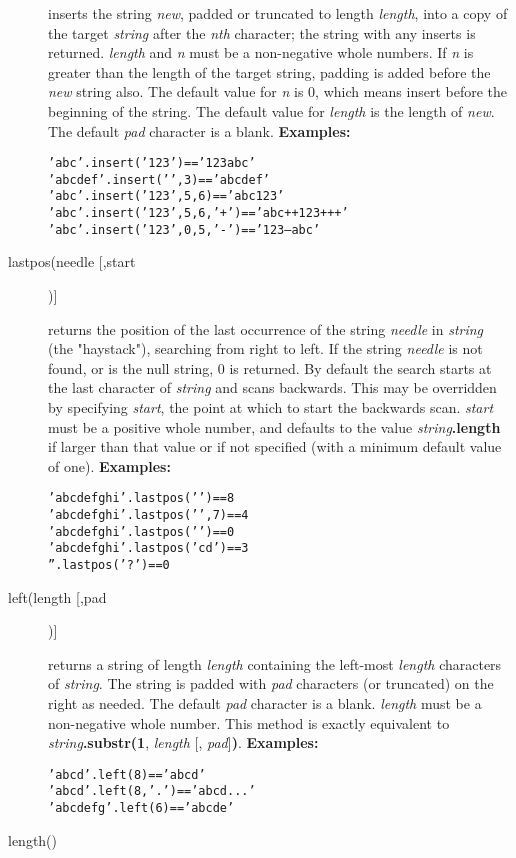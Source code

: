 \begin{description}
inserts the string \emph{new}, padded or truncated to length
\emph{length}, into a copy of the target \emph{string} after the
\emph{n}\emph{th} character; the string with any inserts is returned.
\emph{length} and \emph{n} must be a non-negative whole numbers.
If \emph{n} is greater than the length of the target string,
padding is added before the \emph{new} string also.
The default value for \emph{n} is 0, which means insert before the
beginning of the string.  The default value for \emph{length} is
the length of \emph{new}.  The default \emph{pad} character is
a blank.
 \textbf{Examples:}
\begin{alltt}
'abc'.insert('123')         == '123abc'
'abcdef'.insert(' ',3)      == 'abc def'
'abc'.insert('123',5,6)     == 'abc  123   '
'abc'.insert('123',5,6,'+') == 'abc++123+++'
'abc'.insert('123',0,5,'-') == '123--abc'
\end{alltt}
\item[lastpos(needle [,start])]\label{reflastpos}

returns the position of the last occurrence of the string
\emph{needle} in \emph{string} (the "haystack"), searching
from right to left.
If the string \emph{needle} is not found, or is the null string,
0 is returned.
By default the search starts at the last character of
\emph{string} and scans backwards.
This may be overridden by specifying \emph{start}, the point at
which to start the backwards scan.
\emph{start} must be a positive whole number, and defaults to the
value \emph{string}\textbf{.length} if larger than that
value or if not specified (with a minimum default value of one).
 \textbf{Examples:}
\begin{alltt}
'abc def ghi'.lastpos(' ')   == 8
'abc def ghi'.lastpos(' ',7) == 4
'abcdefghi'.lastpos(' ')     == 0
'abcdefghi'.lastpos('cd')    == 3
''.lastpos('?')              == 0
\end{alltt}
\item[left(length [,pad])]\label{refleft}

returns a string of length \emph{length} containing the
left-most \emph{length} characters of \emph{string}.
The string is padded with \emph{pad} characters (or truncated) on
the right as needed.
The default \emph{pad} character is a blank.
\emph{length} must be a non-negative whole number.
This method is exactly equivalent to
\emph{string}\textbf{.substr(1}, \emph{length}
[, \emph{pad}]\textbf{)}.
 \textbf{Examples:}
\begin{alltt}
'abc d'.left(8)     == 'abc d   '
'abc d'.left(8,'.') == 'abc d...'
'abc defg'.left(6)  == 'abc de'
\end{alltt}
\item[length()]\label{reflength}


\end{description}
